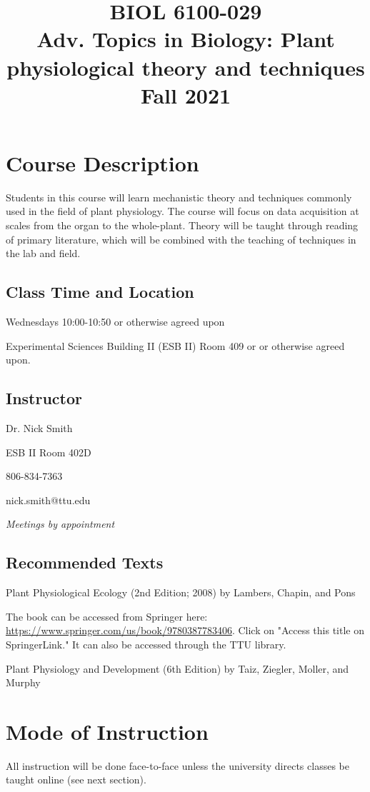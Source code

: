 \documentclass[12pt, notitlepage]{article}   	%
\title{
	\textbf{
		BIOL 6100-029
	} \\
	\large Adv. Topics in Biology: Plant physiological theory and techniques \\
	\large Fall 2021
}
\date{\vspace{-5ex}}
\begin{document}
{\selectfont %

\maketitle

\section{Course Description}
Students in this course will learn mechanistic theory and techniques commonly used in
the field of plant physiology. The course will focus on data acquisition at scales from
the organ to the whole-plant. Theory will be taught through reading of primary literature,
which will be combined with the teaching of techniques in the lab and field.

\subsection{Class Time and Location}
Wednesdays 10:00-10:50 or otherwise agreed upon

Experimental Sciences Building II (ESB II) Room 409 or 
or otherwise agreed upon.

\subsection{Instructor}
Dr. Nick Smith \par
ESB II Room 402D \par
806-834-7363 \par
nick.smith@ttu.edu \par
\textit{Meetings by appointment}

\subsection{Recommended Texts}
Plant Physiological Ecology (2nd Edition; 2008) by Lambers, Chapin, and Pons \par
The book can be accessed from Springer here: 
\url{https://www.springer.com/us/book/9780387783406}. Click on "Access this title on 
SpringerLink." It can also be accessed through the TTU library. \par
Plant Physiology and Development (6th Edition) by Taiz, Ziegler, Moller, and Murphy

\section{Mode of Instruction}
All instruction will be done face-to-face unless the university directs classes be taught online (see next section).

}
\end{document}
